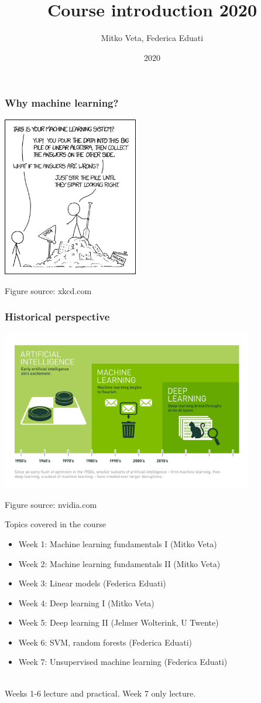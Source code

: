 \documentclass[notes]{beamer}          %
\title{Course introduction 2020}
\author{Mitko Veta, Federica Eduati}
\institute{Eindhoven University of Technology

Department of Biomedical Engineering}
\date{2020}
\begin{document}
 
\frame{\titlepage}

\begin{frame}
\frametitle{Why machine learning?}
\begin{center}
\includegraphics[height=7cm]{../figures/intro/machine_learning.png}
\end{center}
{\tiny Figure source: xkcd.com}
\end{frame}

\begin{frame}
\frametitle{Historical perspective}
\begin{center}
\includegraphics[height=7cm]{../figures/intro/deep_learning.png}
\end{center}
{\tiny Figure source: nvidia.com}
\end{frame}

\begin{frame}{Topics covered in the course}
\begin{itemize}
    \item Week 1: Machine learning fundamentals I (Mitko Veta)
    \item Week 2: Machine learning fundamentals II (Mitko Veta)
    \item Week 3: Linear models (Federica Eduati)
    \item Week 4: Deep learning I (Mitko Veta)
    \item Week 5: Deep learning II (Jelmer Wolterink, U Twente)
    \item Week 6: SVM, random forests (Federica Eduati)
    \item Week 7: Unsupervised machine learning (Federica Eduati) 
\end{itemize}
$\,$\\
Weeks 1-6 lecture and practical. Week 7 only lecture.
\end{frame}
\end{document}
